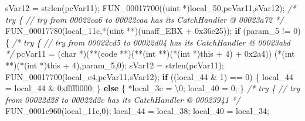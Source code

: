 \documentclass[
]{article}
\newenvironment{Shaded}{}{}
\newcommand{\BaseNTok}[1]{\textcolor[rgb]{0.25,0.63,0.44}{#1}}
\newcommand{\CharTok}[1]{\textcolor[rgb]{0.25,0.44,0.63}{#1}}
\newcommand{\CommentTok}[1]{\textcolor[rgb]{0.38,0.63,0.69}{\textit{#1}}}
\newcommand{\ControlFlowTok}[1]{\textcolor[rgb]{0.00,0.44,0.13}{\textbf{#1}}}
\newcommand{\DataTypeTok}[1]{\textcolor[rgb]{0.56,0.13,0.00}{#1}}
\newcommand{\DecValTok}[1]{\textcolor[rgb]{0.25,0.63,0.44}{#1}}
\newcommand{\NormalTok}[1]{#1}
\newcommand{\OperatorTok}[1]{\textcolor[rgb]{0.40,0.40,0.40}{#1}}
\newcommand{\SpecialCharTok}[1]{\textcolor[rgb]{0.25,0.44,0.63}{#1}}
\begin{document}
\begin{Shaded}
\begin{Highlighting}[]
\NormalTok{  sVar12 }\OperatorTok{=}\NormalTok{ strlen}\OperatorTok{(}\NormalTok{pcVar11}\OperatorTok{);}
\NormalTok{  FUN\_00017700}\OperatorTok{((}\NormalTok{uint }\OperatorTok{*)}\NormalTok{local\_50}\OperatorTok{,}\NormalTok{pcVar11}\OperatorTok{,}\NormalTok{sVar12}\OperatorTok{);}
                    \CommentTok{/* try \{ // try from 00022ca6 to 00022caa has its CatchHandler @ 00023a72 */}
\NormalTok{  FUN\_00017780}\OperatorTok{(}\NormalTok{local\_11c}\OperatorTok{,*(}\NormalTok{uint }\OperatorTok{**)(}\NormalTok{unaff\_EBX }\OperatorTok{+} \BaseNTok{0x36e25}\OperatorTok{));}
  \ControlFlowTok{if} \OperatorTok{(}\NormalTok{param\_5 }\OperatorTok{!=} \DecValTok{0}\OperatorTok{)} \OperatorTok{\{}
                    \CommentTok{/* try \{ // try from 00022cd5 to 00022d04 has its CatchHandler @ 00023abd */}
\NormalTok{    pcVar11 }\OperatorTok{=} \OperatorTok{(}\DataTypeTok{char} \OperatorTok{*)(**(}\NormalTok{code }\OperatorTok{**)(**(}\DataTypeTok{int} \OperatorTok{**)(*(}\DataTypeTok{int} \OperatorTok{*)}\NormalTok{this }\OperatorTok{+} \DecValTok{4}\OperatorTok{)} \OperatorTok{+} \BaseNTok{0x2a4}\OperatorTok{))}
                                \OperatorTok{(*(}\DataTypeTok{int} \OperatorTok{**)(*(}\DataTypeTok{int} \OperatorTok{*)}\NormalTok{this }\OperatorTok{+} \DecValTok{4}\OperatorTok{),}\NormalTok{param\_5}\OperatorTok{,}\DecValTok{0}\OperatorTok{);}
\NormalTok{    sVar12 }\OperatorTok{=}\NormalTok{ strlen}\OperatorTok{(}\NormalTok{pcVar11}\OperatorTok{);}
\NormalTok{    FUN\_00017700}\OperatorTok{(}\NormalTok{local\_e4}\OperatorTok{,}\NormalTok{pcVar11}\OperatorTok{,}\NormalTok{sVar12}\OperatorTok{);}
    \ControlFlowTok{if} \OperatorTok{((}\NormalTok{local\_44 }\OperatorTok{\&} \DecValTok{1}\OperatorTok{)} \OperatorTok{==} \DecValTok{0}\OperatorTok{)} \OperatorTok{\{}
\NormalTok{      local\_44 }\OperatorTok{=}\NormalTok{ local\_44 }\OperatorTok{\&} \BaseNTok{0xffff0000}\OperatorTok{;}
    \OperatorTok{\}}
    \ControlFlowTok{else} \OperatorTok{\{}
      \OperatorTok{*}\NormalTok{local\_3c }\OperatorTok{=} \CharTok{\textquotesingle{}}\SpecialCharTok{\textbackslash{}0}\CharTok{\textquotesingle{}}\OperatorTok{;}
\NormalTok{      local\_40 }\OperatorTok{=} \DecValTok{0}\OperatorTok{;}
    \OperatorTok{\}}
                    \CommentTok{/* try \{ // try from 00022d28 to 00022d2c has its CatchHandler @ 00023941 */}
\NormalTok{    FUN\_0001c960}\OperatorTok{(}\NormalTok{local\_11c}\OperatorTok{,}\DecValTok{0}\OperatorTok{);}
\NormalTok{    local\_44 }\OperatorTok{=}\NormalTok{ local\_38}\OperatorTok{;}
\NormalTok{    local\_40 }\OperatorTok{=}\NormalTok{ local\_34}\OperatorTok{;}

\end{Highlighting}
\end{Shaded}
\end{document}
